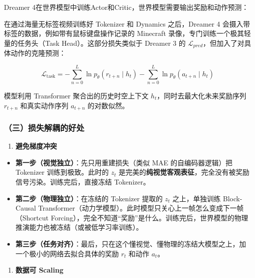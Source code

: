 Dreamer 4在世界模型中训练Actor和Critic，世界模型需要输出奖励和动作预测：

在通过海量无标签视频训练好 Tokenizer 和 Dynamics 之后，Dreamer 4 会摄入带标签的数据，例如带有鼠标键盘操作记录的 Minecraft 录像，专门训练一个极其轻量的任务头（Task Head）。这部分损失类似于 Dreamer 3 的 \(\mathcal{L}_{pred}\)，但加入了对具体动作的克隆预测：

\[
\mathcal{L}_{\mathrm{task}}=-\sum_{n=0}^{L}\ln p_{\theta}(r_{t+n}\mid h_t)-\sum_{n=0}^{L}\ln p_{\theta}(a_{t+n}\mid h_t)
\]

模型利用 Transformer 聚合出的历史时空上下文 \(h_t\)，同时去最大化未来奖励序列 \(r_{t+n}\) 和真实动作序列 \(a_{t+n}\) 的对数似然。

\hypertarget{ux4e09ux635fux5931ux89e3ux8026ux7684ux597dux5904}{%
\subsubsection{（三）损失解耦的好处}\label{ux4e09ux635fux5931ux89e3ux8026ux7684ux597dux5904}}

\begin{enumerate}
\def\labelenumi{\arabic{enumi}.}
\tightlist
\item
  \textbf{避免梯度冲突}
\end{enumerate}

\begin{itemize}
\tightlist
\item
  \textbf{第一步（视觉独立）}：先只用重建损失（类似 MAE 的自编码器逻辑）把 Tokenizer 训练到极致。此时的 \(z_t\) 是完美的\textbf{纯视觉客观表征}，完全没有被奖励信号污染。训练完后，直接冻结 Tokenizer。
\item
  \textbf{第二步（物理独立）}：在冻结的 Tokenizer 提取的 \(z_t\) 之上，单独训练 Block-Causal Transformer（动力学模型）。此时模型只关心上一帧怎么变成下一帧（Shortcut Forcing），完全不知道``奖励''是什么。训练完后，世界模型的物理推演能力也被冻结（或被低学习率训练）。
\item
  \textbf{第三步（任务对齐）}：最后，只在这个懂视觉、懂物理的冻结大模型之上，加一个极小的网络去拟合具体的奖励 \(r_t\) 和动作 \(a_t\)。
\end{itemize}

\begin{enumerate}
\def\labelenumi{\arabic{enumi}.}
\setcounter{enumi}{1}
\tightlist
\item
  \textbf{数据可 Scaling}
\end{enumerate}

